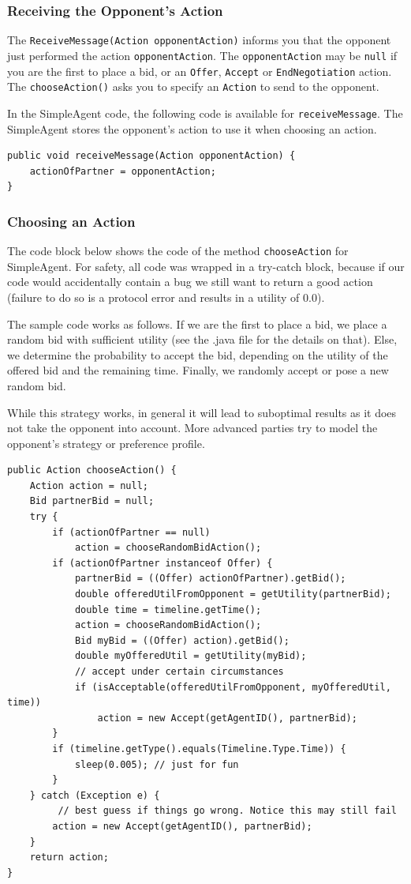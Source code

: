 \documentclass[]{article}
\begin{document}
\FloatBarrier

\subsubsection{Receiving the Opponent's Action}\label{sec:receiveAction}
The \texttt{ReceiveMessage(Action opponentAction)} informs you that the opponent just performed the action \texttt{opponentAction}. The \texttt{opponentAction} may be  \texttt{null} if you are the first to place a bid, or an \texttt{Offer}, \texttt{Accept} or \texttt{EndNegotiation} action.
The \texttt{chooseAction()} asks you to specify an \texttt{Action} to send to the opponent.

In the SimpleAgent code, the following code is available for \texttt{receiveMessage}. The SimpleAgent stores the opponent's action to use it when choosing an action.

\begin{lstlisting}
public void receiveMessage(Action opponentAction) {
	actionOfPartner = opponentAction;
}
\end{lstlisting}

\subsubsection{Choosing an Action}\label{sec:chooseAction}
The code block below shows the code of the method \texttt{chooseAction} for SimpleAgent. For safety, all code was wrapped in a try-catch block, because if our code would accidentally contain a bug we still want to return a good action (failure to do so is a protocol error and results in a utility of 0.0).

The sample code works as follows. If we are the first to place a bid, we place a random bid with sufficient utility (see the .java file for the details on that). Else, we determine the probability to accept the bid, depending on the utility of the offered bid and the remaining time. Finally, we randomly accept or pose a new random bid.

While this strategy works, in general it will lead to suboptimal results as it does not take the opponent into account. More advanced parties try to model the opponent's strategy or preference profile.

\begin{lstlisting}
public Action chooseAction() {
	Action action = null;
	Bid partnerBid = null;
	try {
		if (actionOfPartner == null)
			action = chooseRandomBidAction();
		if (actionOfPartner instanceof Offer) {
			partnerBid = ((Offer) actionOfPartner).getBid();
			double offeredUtilFromOpponent = getUtility(partnerBid);
			double time = timeline.getTime();
			action = chooseRandomBidAction();
			Bid myBid = ((Offer) action).getBid();
			double myOfferedUtil = getUtility(myBid);
			// accept under certain circumstances
			if (isAcceptable(offeredUtilFromOpponent, myOfferedUtil, time))
				action = new Accept(getAgentID(), partnerBid);
		}
		if (timeline.getType().equals(Timeline.Type.Time)) {
			sleep(0.005); // just for fun
		}
	} catch (Exception e) {
		 // best guess if things go wrong. Notice this may still fail
		action = new Accept(getAgentID(), partnerBid);
	}
	return action;
}
\end{lstlisting}
\end{document}
